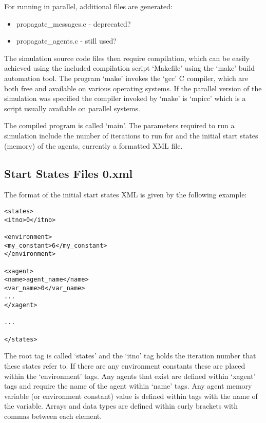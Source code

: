 For running in parallel, additional files are generated:

\begin{itemize}
  \item propagate\_messages.c - deprecated?
  \item propagate\_agents.c - still used?
\end{itemize}

The simulation source code files then require compilation, which can be easily
achieved using the included compilation script `Makefile' using the `make'
build automation tool. The program `make' invokes the `gcc' C compiler, which
are both free and available on various operating systems. If the parallel
version of the simulation was specified the compiler invoked by `make' is
`mpicc' which is a script usually available on parallel systems.

The compiled program is called `main'. The parameters required to run a
simulation include the number of iterations to run for and the initial start
states (memory) of the agents, currently a formatted XML file.

\subsection{Start States Files 0.xml}

The format of the initial start states XML is given by the following example:

\begin{mylisting}
\begin{verbatim}
<states>
<itno>0</itno>

<environment>
<my_constant>6</my_constant>
</environment>

<xagent>
<name>agent_name</name>
<var_name>0</var_name>
...
</xagent>

...

</states>
\end{verbatim}
\end{mylisting}

The root tag is called `states' and the `itno' tag holds the iteration number
that these states refer to. If there are any environment constants these are
placed within the `environment' tags. Any agents that exist are defined within
`xagent' tags and require the name of the agent within `name' tags. Any agent
memory variable (or environment constant) value is defined within tags with
the name of the variable. Arrays and data types are defined within curly
brackets with commas between each element.

